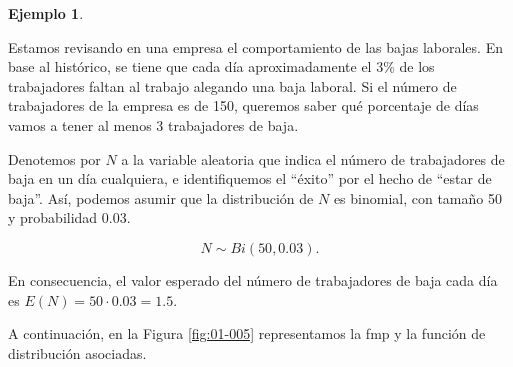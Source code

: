 \documentclass[
]{book}
\theoremstyle{definition}
\theoremstyle{definition}
\newtheorem{example}{Ejemplo}[chapter]
\theoremstyle{definition}
\theoremstyle{definition}
\theoremstyle{remark}
\begin{document}
\begin{example}
\protect\hypertarget{exm:binom01}{}\label{exm:binom01}

Estamos revisando en una empresa el comportamiento de las bajas laborales. En base al histórico, se tiene que cada día aproximadamente el 3\% de los trabajadores faltan al trabajo alegando una baja laboral. Si el número de trabajadores de la empresa es de 150, queremos saber qué porcentaje de días vamos a tener al menos 3 trabajadores de baja.

Denotemos por \(N\) a la variable aleatoria que indica el número de trabajadores de baja en un día cualquiera, e identifiquemos el ``éxito'' por el hecho de ``estar de baja''. Así, podemos asumir que la distribución de \(N\) es binomial, con tamaño 50 y probabilidad 0.03.

\[N \sim Bi(50,0.03).\]

En consecuencia, el valor esperado del número de trabajadores de baja cada día es \(E(N) = 50 \cdot 0.03=1.5\).

A continuación, en la Figura \ref{fig:01-005} representamos la fmp y la función de distribución asociadas.


\end{example}
\end{document}
